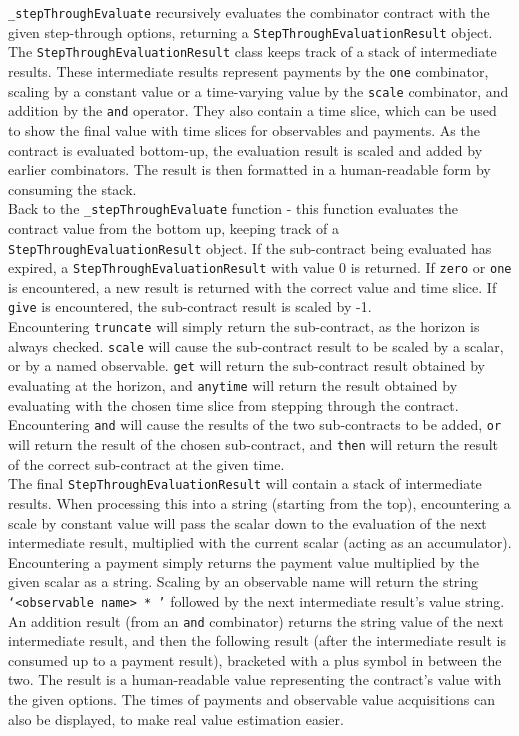 \texttt{\_stepThroughEvaluate} recursively evaluates the combinator contract with the given step-through options, returning a \texttt{StepThroughEvaluationResult} object. The \texttt{StepThroughEvaluationResult} class keeps track of a stack of intermediate results. These intermediate results represent payments by the \texttt{one} combinator, scaling by a constant value or a time-varying value by the \texttt{scale} combinator, and addition by the \texttt{and} operator. They also contain a time slice, which can be used to show the final value with time slices for observables and payments. As the contract is evaluated bottom-up, the evaluation result is scaled and added by earlier combinators. The result is then formatted in a human-readable form by consuming the stack. \\

Back to the \texttt{\_stepThroughEvaluate} function - this function evaluates the contract value from the bottom up, keeping track of a \texttt{StepThroughEvaluationResult} object. If the sub-contract being evaluated has expired, a \texttt{StepThroughEvaluationResult} with value 0 is returned. If \texttt{zero} or \texttt{one} is encountered, a new result is returned with the correct value and time slice. If \texttt{give} is encountered, the sub-contract result is scaled by -1. \\

Encountering \texttt{truncate} will simply return the sub-contract, as the horizon is always checked. \texttt{scale} will cause the sub-contract result to be scaled by a scalar, or by a named observable. \texttt{get} will return the sub-contract result obtained by evaluating at the horizon, and \texttt{anytime} will return the result obtained by evaluating with the chosen time slice from stepping through the contract. \\

Encountering \texttt{and} will cause the results of the two sub-contracts to be added, \texttt{or} will return the result of the chosen sub-contract, and \texttt{then} will return the result of the correct sub-contract at the given time. \\

The final \texttt{StepThroughEvaluationResult} will contain a stack of intermediate results. When processing this into a string (starting from the top), encountering a scale by constant value will pass the scalar down to the evaluation of the next intermediate result, multiplied with the current scalar (acting as an accumulator). Encountering a payment simply returns the payment value multiplied by the given scalar as a string. Scaling by an observable name will return the string \texttt{`<observable name> * '} followed by the next intermediate result's value string. An addition result (from an \texttt{and} combinator) returns the string value of the next intermediate result, and then the following result (after the intermediate result is consumed up to a payment result), bracketed with a plus symbol in between the two. The result is a human-readable value representing the contract's value with the given options. The times of payments and observable value acquisitions can also be displayed, to make real value estimation easier.


